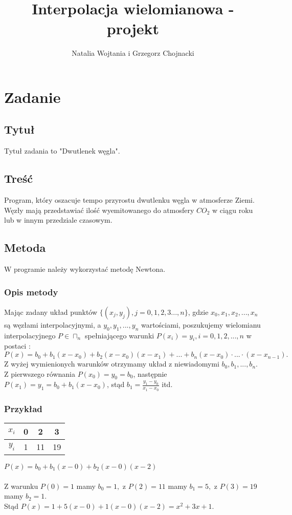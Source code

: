 \documentclass[12pt]{article}
\title{Interpolacja wielomianowa - projekt}
\author{Natalia Wojtania i Grzegorz Chojnacki}
\begin{document}
\maketitle

\section{Zadanie}
\subsection{Tytuł}
Tytuł zadania to "Dwutlenek węgla".
\subsection{Treść}
Program,  który  oszacuje  tempo  przyrostu dwutlenku węgla w atmosferze Ziemi. Węzły mają  przedstawiać  ilość  wyemitowanego  do atmosfery $ CO_{2}$ w  ciągu  roku  lub  w  innym przedziale czasowym.
\subsection{Metoda}
W programie należy wykorzystać metodę Newtona.
\subsubsection{Opis metody}
Mając zadany układ punktów $\{(x_{j},y_{j}),j=0,1,2,3...,n\}$, gdzie $x_{0},x_{1},x_{2},...,x_{n}$ są węzłami interpolacyjnymi, a $y_{0},y_{1},...,y_{n}$ wartościami, poszukujemy wielomianu interpolacyjnego $P \in \sqcap_{n}$ spełniającego warunki $P(x_{i})=y_{i}, i=0,1,2,...,n$ w postaci :
$$ P(x)=b_{0}+b_{1}(x-x_{0})+b_{2}(x-x_{0})(x-x_{1})+...+b_{n}(x-x_{0})\cdot...\cdot(x-x_{n-1}).$$
Z wyżej wymienionych warunków otrzymamy układ z niewiadomymi $b_{0},b_{1},...,b_{n}.$ 
Z pierwszego równania $P(x_{0})=y_{0}=b_{0}$, następnie $P(x_{1})=y_{1}=b_{0}+b_{1}(x-x_{0})$, stąd $b_{1}=\frac{y_{1}-y_{0}}{x_{1}-x_{0}}$ itd.
\subsubsection{Przykład}
\begin{tabular}{c|c|c|c}
$x_{i}$&0&2&3 \\ \hline
$y_{i}$&1&11&19
\end{tabular}
\hspace{10mm} $ P(x)=b_{0}+b_{1}(x-0)+b_{2}(x-0)(x-2)$
\\ \\
Z warunku $P(0)=1$ mamy $ b_{0}=1,$ z $P(2)=11$ mamy $b_{1}=5,$ z $ P(3)=19 $ mamy $ b_{2}=1.$
\\Stąd $P(x)=1+5(x-0)+1(x-0)(x-2)=x^{2}+3x+1.$
\section{}
\end{document}
